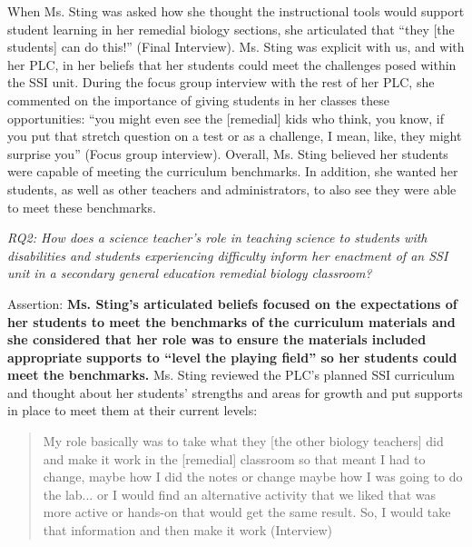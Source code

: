 \documentclass[11.5pt]{sig-alternate}
\begin{document}
\begin{large}
When Ms. Sting was asked how she thought the instructional tools would support student learning in her remedial biology sections, she articulated that “they [the students] can do this!” (Final Interview). Ms. Sting was explicit with us, and with her PLC, in her beliefs that her students could meet the challenges posed within the SSI unit. During the focus group interview with the rest of her PLC, she commented on the importance of giving students in her classes these opportunities: “you might even see the [remedial] kids who think, you know, if you put that stretch question on a test or as a challenge, I mean, like, they might surprise you” (Focus group interview). Overall, Ms. Sting believed her students were capable of meeting the curriculum benchmarks. In addition, she wanted her students, as well as other teachers and administrators, to also see they were able to meet these benchmarks.

\textit{RQ2: How does a science teacher’s role in teaching science to students with disabilities and students experiencing difficulty inform her enactment of an SSI unit in a secondary general education remedial biology classroom?}

Assertion: \textbf{Ms. Sting’s articulated beliefs focused on the expectations of her students to meet the benchmarks of the curriculum materials and she considered that her role was to ensure the materials included appropriate supports to “level the playing field” so her students could meet the benchmarks.} Ms. Sting reviewed the PLC’s planned SSI curriculum and thought about her students’ strengths and areas for growth and put supports in place to meet them at their current levels:

\begin{quote}
    My role basically was to take what they [the other biology teachers] did and make it work in the [remedial] classroom so that meant I had to change, maybe how I did the notes or change maybe how I was going to do the lab... or I would find an alternative activity that we liked that was more active or hands-on that would get the same result. So, I would take that information and then make it work (Interview)
\end{quote}


\end{large}
\end{document}
